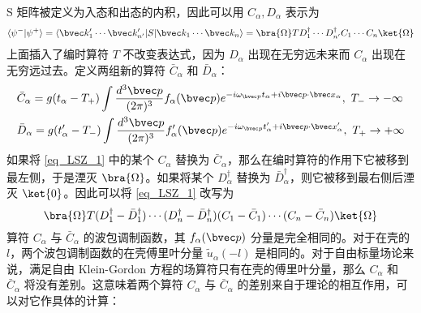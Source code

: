 S 矩阵被定义为入态和出态的内积，因此可以用 $C_\alpha,D_\alpha$ 表示为
\begin{equation}\label{eq_LSZ_1} \begin{aligned}
\langle\psi^-|\psi^+\rangle=\langle\bvec k'_1 \cdots \bvec k'_{n'}|S|\bvec k_1\cdots\bvec k_n\rangle=\bra{\Omega} T D_1^\dagger \cdots D_{n'}^\dagger C_1\cdots C_n \ket{\Omega}
\end{aligned}\end{equation} 
上面插入了编时算符 $T$ 不改变表达式，因为 $D_\alpha$ 出现在无穷远未来而 $C_\alpha$ 出现在无穷远过去。定义两组新的算符 $\bar C_\alpha$ 和 $\bar D_\alpha$：
\begin{equation} \begin{aligned}
&\bar C_\alpha=g(t_\alpha-T_+)\int \frac{d^3{\bvec p}}{(2\pi)^3} f_\alpha(\bvec p)e^{-i\omega_{\bvec p}t_\alpha+i\bvec p\cdot \bvec x_\alpha},\ T_-\rightarrow -\infty\\
&\bar D_\alpha=g(t'_\alpha-T_-)\int \frac{d^3{\bvec p}}{(2\pi)^3} f'_\alpha(\bvec p)e^{-i\omega_{\bvec p}t'_\alpha+i\bvec p\cdot \bvec x'_\alpha},\ T_+\rightarrow +\infty
\end{aligned}\end{equation}
如果将 \autoref{eq_LSZ_1}  中的某个 $C_\alpha$ 替换为 $\bar{C}_\alpha$，那么在编时算符的作用下它被移到最左侧，于是湮灭 $\bra{\Omega}$。如果将某个 $D_\alpha^\dagger$ 替换为 $\bar{D}_\alpha^\dagger$，则它被移到最右侧后湮灭 $\ket{0}$。因此可以将 \autoref{eq_LSZ_1}  改写为
\[
\bra{\Omega} T (D_1^\dagger-\bar{D}_1^\dagger) \cdots (D_n^\dagger-\bar{D}_n^\dagger) (C_1-\bar{C}_1)\cdots (C_n-\bar{C}_n) \ket{\Omega}
\]
算符 $C_\alpha$ 与 $\bar{C}_\alpha$ 的波包调制函数，其 $f_\alpha(\bvec p)$ 分量是完全相同的。对于在壳的 $l$，两个波包调制函数的在壳傅里叶分量 $\tilde{u}_\alpha(-l)$ 是相同的。对于自由标量场论来说，满足自由 Klein-Gordon 方程的场算符只有在壳的傅里叶分量，那么 $C_\alpha$ 和 $\bar{C}_\alpha$ 将没有差别。这意味着两个算符 $C_\alpha$ 与 $\bar{C}_\alpha$ 的差别来自于理论的相互作用，可以对它作具体的计算：
